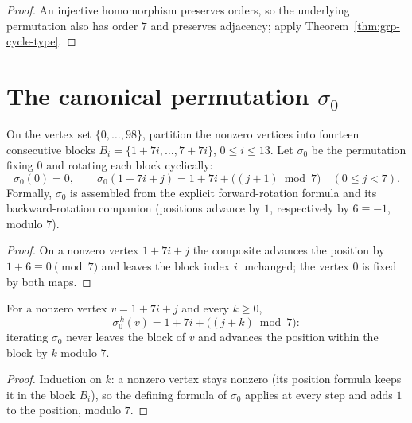 \begin{proof}\leanok
{}
An injective homomorphism preserves orders, so the underlying permutation
also has order $7$ and preserves adjacency; apply
Theorem~\ref{thm:grp-cycle-type}.
\end{proof}

\section{The canonical permutation \texorpdfstring{$\sigma_0$}{sigma0}}

\begin{definition}\label{def:sigma0}
On the vertex set $\{0,\dots,98\}$, partition the nonzero vertices into
fourteen consecutive blocks $B_i = \{1+7i, \dots, 7+7i\}$, $0 \le i \le 13$.
Let $\sigma_0$ be the permutation fixing $0$ and rotating each block
cyclically:
\[
  \sigma_0(0) = 0, \qquad
  \sigma_0(1 + 7i + j) = 1 + 7i + \bigl((j+1) \bmod 7\bigr)
  \quad (0 \le j < 7).
\]
Formally, $\sigma_0$ is assembled from the explicit forward-rotation formula
and its backward-rotation companion (positions advance by $1$, respectively
by $6 \equiv -1$, modulo $7$).
\leanok
{}
\end{definition}

\begin{proof}\leanok
On a nonzero vertex $1+7i+j$ the composite advances the position by
$1 + 6 \equiv 0 \pmod 7$ and leaves the block index $i$ unchanged; the vertex
$0$ is fixed by both maps.
\end{proof}

\begin{lemma}\label{lem:grp-sigma0-iterate}
For a nonzero vertex $v = 1 + 7i + j$ and every $k \ge 0$,
\[
  \sigma_0^{\,k}(v) = 1 + 7i + \bigl((j+k) \bmod 7\bigr):
\]
iterating $\sigma_0$ never leaves the block of $v$ and advances the position
within the block by $k$ modulo $7$.
\leanok
{}
\end{lemma}

\begin{proof}\leanok
Induction on $k$: a nonzero vertex stays nonzero (its position formula keeps
it in the block $B_i$), so the defining formula of $\sigma_0$ applies at every
step and adds $1$ to the position, modulo $7$.
\end{proof}

